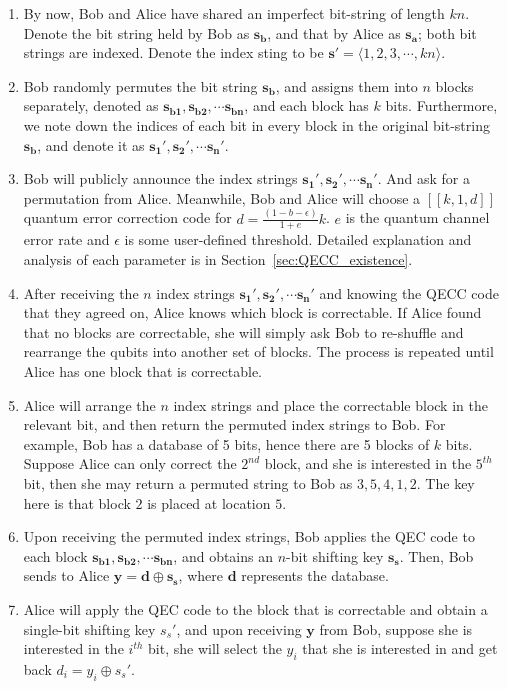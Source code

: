 \documentclass[%
 reprint,
superscriptaddress,
 amsmath,amssymb,
 aps,
]{revtex4-2}
\begin{document}
\begin{enumerate}
    \item By now, Bob and Alice have shared an imperfect bit-string of length $kn$. Denote the bit string held by Bob as $\mathbf{s_b}$, and that by Alice as $\mathbf{s_a}$; both bit strings are indexed. Denote the index sting to be $\mathbf{s'}=\langle1, 2, 3, \cdots, kn\rangle$.

    \item Bob randomly permutes the bit string $\mathbf{s_b}$, and assigns them into $n$ blocks separately, denoted as $\mathbf{s_{b1}}, \mathbf{s_{b2}},\cdots \mathbf{s_{bn}}$, and each block has $k$ bits. Furthermore, we note down the indices of each bit in every block in the original bit-string $\mathbf{s_b}$, and denote it as $\mathbf{s_{1}'}, \mathbf{s_{2}'},\cdots \mathbf{s_{n}'}$.

    \item Bob will publicly announce the index strings $\mathbf{s_1'}, \mathbf{s_2'},\cdots \mathbf{s_n'}$. And ask for a permutation from Alice. Meanwhile, Bob and Alice will choose a $[[k, 1, d]]$ quantum error correction code for $d=\frac{(1-b-\epsilon)}{1+e}k$. $e$ is the quantum channel error rate and $\epsilon$ is some user-defined threshold. Detailed explanation and analysis of each parameter is in Section~\ref{sec:QECC_existence}.

    \item After receiving the $n$ index strings $\mathbf{s_1'}, \mathbf{s_2'},\cdots \mathbf{s_n'}$ and knowing the QECC code that they agreed on, Alice knows which block is correctable. If Alice found that no blocks are correctable, she will simply ask Bob to re-shuffle and rearrange the qubits into another set of blocks. The process is repeated until Alice has one block that is correctable. 
    
    \item Alice will arrange the $n$ index strings and place the correctable block in the relevant bit, and then return the permuted index strings to Bob. For example, Bob has a database of 5 bits, hence there are 5 blocks of $k$ bits. Suppose Alice can only correct the $2^{nd}$ block, and she is interested in the $5^{th}$ bit, then she may return a permuted string to Bob as $3, 5, 4, 1, 2$. The key here is that block $2$ is placed at location $5$. 

    \item Upon receiving the permuted index strings, Bob applies the QEC code to each block $\mathbf{s_{b1}}, \mathbf{s_{b2}},\cdots \mathbf{s_{bn}}$, and obtains an $n$-bit shifting key $\mathbf{s_s}$. Then, Bob sends to Alice $\mathbf{y}=\mathbf{d}\oplus\mathbf{s_s}$, where $\mathbf{d}$ represents the database.

    \item Alice will apply the QEC code to the block that is correctable and obtain a single-bit shifting key $s_s'$, and upon receiving $\mathbf{y}$ from Bob, suppose she is interested in the $i^{th}$ bit, she will select the $y_i$ that she is interested in and get back $d_i=y_i\oplus s_s'$.
    
\end{enumerate}
\end{document}
